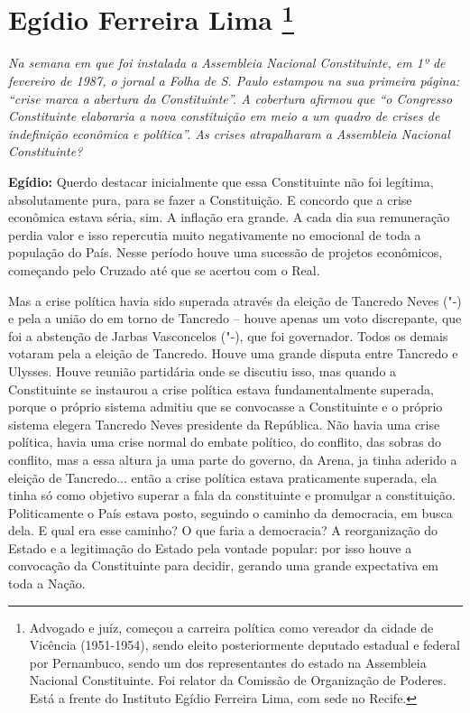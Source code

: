 \chapter{Egídio Ferreira Lima
\footnote{Advogado e juíz, começou a carreira política como vereador da cidade de
Vicência (1951-1954), sendo eleito posteriormente deputado estadual e
federal por Pernambuco, sendo um dos representantes do estado na
Assembleia Nacional Constituinte. Foi relator da Comissão de Organização
de Poderes. Está a frente do Instituto Egídio Ferreira Lima, com sede no
Recife.}}

\emph{Na semana em que foi instalada a Assembleia Nacional
Constituinte, em 1º de fevereiro de 1987, o jornal a Folha de S. Paulo
estampou na sua primeira página: ``crise marca a abertura da
Constituinte''. A cobertura afirmou que ``o Congresso Constituinte
elaboraria a nova constituição em meio a um quadro de crises de
indefinição econômica e política''. As crises atrapalharam a Assembleia
Nacional Constituinte?}

\textbf{Egídio:} Querdo destacar inicialmente que essa Constituinte não
foi legítima, absolutamente pura, para se fazer a Constituição. E
concordo que a crise econômica estava séria, sim. A inflação era grande.
A cada dia sua remuneração perdia valor e isso repercutia muito
negativamente no emocional de toda a população do País. Nesse período
houve uma sucessão de projetos econômicos, começando pelo Cruzado até
que se acertou com o Real.

Mas a crise política havia sido superada através da eleição de Tancredo
Neves ("-) e pela a união do  em torno de Tancredo -- houve
apenas um voto discrepante, que foi a abstenção de Jarbas Vasconcelos
("-), que foi governador. Todos os demais votaram pela a eleição de
Tancredo. Houve uma grande disputa entre Tancredo e Ulysses. Houve
reunião partidária onde se discutiu isso, mas quando a Constituinte se
instaurou a crise política estava fundamentalmente superada, porque o
próprio sistema admitiu que se convocasse a Constituinte e o próprio
sistema elegera Tancredo Neves presidente da República. Não havia uma
crise política, havia uma crise normal do embate político, do conflito,
das sobras do conflito, mas a essa altura ja uma parte do governo, da
Arena, ja tinha aderido a eleição de Tancredo... então a crise política
estava praticamente superada, ela tinha só como objetivo superar a fala
da constituinte e promulgar a constituição. Politicamente o País estava
posto, seguindo o caminho da democracia, em busca dela. E qual era esse
caminho? O que faria a democracia? A reorganização do Estado e a
legitimação do Estado pela vontade popular: por isso houve a convocação
da Constituinte para decidir, gerando uma grande expectativa em toda a
Nação.

